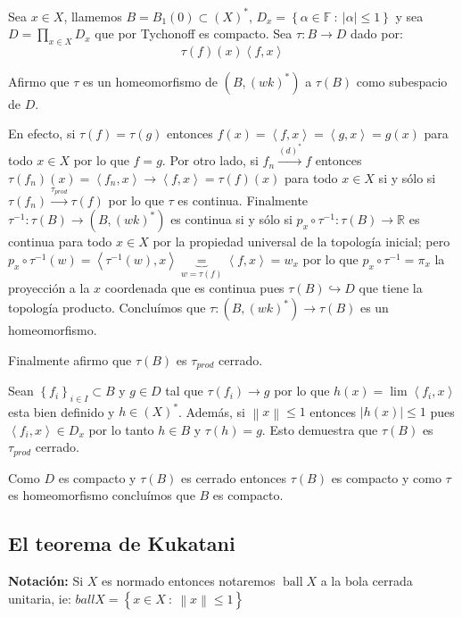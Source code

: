 \documentclass[11pt]{article}
\newcommand{\inc}{\hookrightarrow}
\newcommand{\R}{{\mathbb{R}}}
\newcommand\tq{~:~}
\newcommand{\dual}[1]{\left(#1\right)^{\ast}}
\newcommand{\norm}[1]{\left\lVert#1\right\rVert}
\newcommand{\abs}[1]{\left\lvert#1\right\rvert}
\newcommand{\ip}[1]{\left\langle#1\right\rangle}
\newcommand{\sett}[1]{\left\lbrace#1\right\rbrace}
\newcommand{\Bigprod}[2]{\prod\limits_{#1}{#2}}
\DeclareMathOperator{\ball}{ball}
\numberwithin{theorem}{subsection}
\newenvironment{proof}[1][Demostraci\'on]{\begin{trivlist}
		\item[\hskip \labelsep {\bfseries #1}]}{\end{trivlist}}
\newcommand{\qed}{\nobreak \ifvmode \relax \else
	\ifdim\lastskip<1.5em \hskip-\lastskip
	\hskip1.5em plus0em minus0.5em \fi \nobreak
	\vrule height0.75em width0.5em depth0.25em\fi}
\begin{document}
\begin{proof}
	Sea $x \in X$, llamemos $B=B_1(0) \subset \dual{X}$, $D_x = \sett{\alpha \in \mathbb{F} \tq \abs{\alpha} \leq 1}$ y sea $D = \Bigprod{x \in X}{D_x}$ que por Tychonoff es compacto. Sea $\tau: B \rightarrow D$ dado por:
	\begin{equation*}
	\tau \left(f\right)(x) \ip{f, x}
	\end{equation*}
	
	Afirmo que $\tau$ es un homeomorfismo de $\left(B,\dual{wk}\right)$ a $\tau(B)$ como subespacio de $D$.
	
	En efecto, si $\tau(f) = \tau(g)$ entonces $f(x) = \ip{f,x} = \ip{g,x} = g(x)$ para todo $x \in X$ por lo que $f = g$. Por otro lado, si $f_n \xrightarrow{\dual{d}} f$ entonces $\tau(f_n)(x) = \ip{f_n,x} \rightarrow \ip{f,x} = \tau(f)(x)$ para todo $x \in X$ si y s\'olo si $\tau(f_n) \xrightarrow{\tau_{prod}} \tau(f)$ por lo que $\tau$ es continua. Finalmente $\tau^{-1}: \tau(B) \rightarrow \left(B, \dual{wk}\right)$ es continua si y s\'olo si $p_{x} \circ \tau^{-1} : \tau(B) \rightarrow \R$ es continua para todo $x \in X$ por la propiedad universal de la topolog\'ia inicial; pero $p_{x} \circ \tau^{-1}(w) = \ip{\tau^{-1}(w), x} \underbrace{=}_{w = \tau(f)} \ip{f,x} = w_x$ por lo que $p_{x} \circ \tau^{-1} = \pi_x$ la proyecci\'on a la $x$ coordenada que es continua pues $\tau(B) \inc D$ que tiene la topolog\'ia producto. Conclu\'imos que $\tau : \left(B,\dual{wk}\right) \rightarrow \tau(B)$ es un homeomorfismo.
	
	Finalmente afirmo que $\tau(B)$ es $\tau_{prod}$ cerrado.
	
	Sean $\sett{f_i}_{i \in I} \subset B$ y $g \in D$ tal que $\tau(f_i) \rightarrow g$ por lo que $h(x) = \lim \ip{f_i,x}$ esta bien definido y $h \in \dual{X}$. Adem\'as, si $\norm{x} \leq 1$ entonces $\abs{h(x)} \leq 1$ pues $\ip{f_i,x} \in D_x$ por lo tanto $h \in B$ y $\tau(h) = g$. Esto demuestra que $\tau(B)$ es $\tau_{prod}$ cerrado.
	
	Como $D$ es compacto y $\tau(B)$ es cerrado entonces $\tau(B)$ es compacto y como $\tau$ es homeomorfismo conclu\'imos que $B$ es compacto.\qed
	
\end{proof}

\subsection{El teorema de Kukatani}

\textbf{Notaci\'on:} Si $X$ es normado entonces notaremos $\ball X$ a la bola cerrada unitaria, ie: $ball X = \sett{x \in X \tq \norm{x} \leq 1}$
\end{document}
